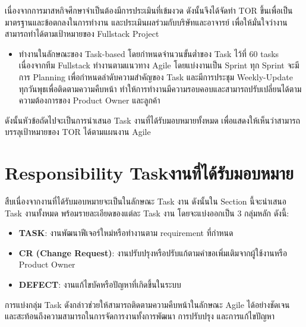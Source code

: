 เนื่องจากการมาสหกิจศึกษาจำเป็นต้องมีการประเมินที่เข้มงวด ดังนั้นจึงได้จัดทำ TOR ขึ้นเพื่อเป็นมาตรฐานและข้อตกลงในการทำงาน  
และประเมินผลร่วมกับบริษัทและอาจารย์ เพื่อให้มั่นใจว่างานสามารถทำได้ตามเป้าหมายของ Fullstack Project  

\begin{itemize}
    \item ทำงานในลักษณะของ Task-based โดยกำหนดจำนวนขั้นต่ำของ Task ไว้ที่ 60 tasks  
    เนื่องจากทีม Fullstack ทำงานตามแนวทาง Agile โดยแบ่งงานเป็น Sprint  
    ทุก Sprint จะมีการ Planning เพื่อกำหนดลำดับความสำคัญของ Task  
    และมีการประชุม Weekly-Update ทุกวันพุธเพื่อติดตามความคืบหน้า ทำให้การทำงานมีความรอบคอบและสามารถปรับเปลี่ยนได้ตามความต้องการของ Product Owner และลูกค้า
\end{itemize}
ดังนั้นหัวข้อถัดไปจะเป็นการนำเสนอ Task งานที่ได้รับมอบหมายทั้งหมด เพื่อแสดงให้เห็นว่าสามารถบรรลุเป้าหมายของ TOR ได้ตามแผนงาน Agile

\section{\ifenglish Responsibility Task\else งานที่ได้รับมอบหมาย\fi}

สืบเนื่องจากงานที่ได้รับมอบหมายจะเป็นในลักษณะ Task งาน  
ดังนั้นใน Section นี้จะนำเสนอ Task งานทั้งหมด พร้อมรายละเอียดของแต่ละ Task งาน  
โดยจะแบ่งออกเป็น 3 กลุ่มหลัก ดังนี้:

\begin{itemize}
    \item \textbf{TASK}: งานพัฒนาฟีเจอร์ใหม่หรือทำงานตาม requirement ที่กำหนด
    \item \textbf{CR (Change Request)}: งานปรับปรุงหรือปรับแก้ตามคำขอเพิ่มเติมจากผู้ใช้งานหรือ Product Owner
    \item \textbf{DEFECT}: งานแก้ไขบัคหรือปัญหาที่เกิดขึ้นในระบบ
\end{itemize}
การแบ่งกลุ่ม Task ดังกล่าวช่วยให้สามารถติดตามความคืบหน้าในลักษณะ Agile ได้อย่างชัดเจน  
และสะท้อนถึงความสามารถในการจัดการงานทั้งการพัฒนา การปรับปรุง และการแก้ไขปัญหา





